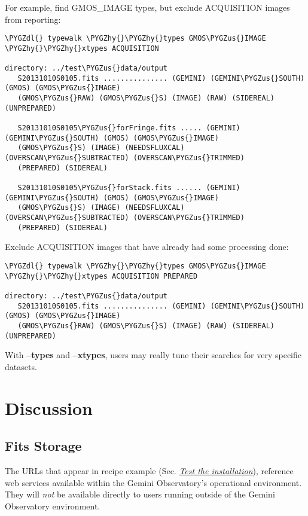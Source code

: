 \documentclass[letterpaper,10pt,english]{sphinxmanual}
\def\PYGZus{\char`\_}
\def\PYGZdl{\char`\$}
\def\PYGZhy{\char`\-}
\begin{document}
For example, find GMOS\_IMAGE types, but exclude ACQUISITION images from reporting:

\begin{Verbatim}[commandchars=\\\{\}]
\PYGZdl{} typewalk \PYGZhy{}\PYGZhy{}types GMOS\PYGZus{}IMAGE \PYGZhy{}\PYGZhy{}xtypes ACQUISITION

directory: ../test\PYGZus{}data/output
   S20131010S0105.fits ............... (GEMINI) (GEMINI\PYGZus{}SOUTH) (GMOS) (GMOS\PYGZus{}IMAGE)
   (GMOS\PYGZus{}RAW) (GMOS\PYGZus{}S) (IMAGE) (RAW) (SIDEREAL) (UNPREPARED)

   S20131010S0105\PYGZus{}forFringe.fits ..... (GEMINI) (GEMINI\PYGZus{}SOUTH) (GMOS) (GMOS\PYGZus{}IMAGE)
   (GMOS\PYGZus{}S) (IMAGE) (NEEDSFLUXCAL) (OVERSCAN\PYGZus{}SUBTRACTED) (OVERSCAN\PYGZus{}TRIMMED)
   (PREPARED) (SIDEREAL)

   S20131010S0105\PYGZus{}forStack.fits ...... (GEMINI) (GEMINI\PYGZus{}SOUTH) (GMOS) (GMOS\PYGZus{}IMAGE)
   (GMOS\PYGZus{}S) (IMAGE) (NEEDSFLUXCAL) (OVERSCAN\PYGZus{}SUBTRACTED) (OVERSCAN\PYGZus{}TRIMMED)
   (PREPARED) (SIDEREAL)
\end{Verbatim}

Exclude ACQUISITION images that have already had some processing done:

\begin{Verbatim}[commandchars=\\\{\}]
\PYGZdl{} typewalk \PYGZhy{}\PYGZhy{}types GMOS\PYGZus{}IMAGE \PYGZhy{}\PYGZhy{}xtypes ACQUISITION PREPARED

directory: ../test\PYGZus{}data/output
   S20131010S0105.fits ............... (GEMINI) (GEMINI\PYGZus{}SOUTH) (GMOS) (GMOS\PYGZus{}IMAGE)
   (GMOS\PYGZus{}RAW) (GMOS\PYGZus{}S) (IMAGE) (RAW) (SIDEREAL) (UNPREPARED)
\end{Verbatim}

With \textbf{--types} and \textbf{--xtypes}, users may really tune their searches for very
specific datasets.


\chapter{Discussion}
\label{discuss:discussion}\label{discuss::doc}

\section{Fits Storage}
\label{discuss:fits-storage}\label{discuss:fitsstore}
The URLs that appear in  recipe example (Sec. {\hyperref[userenv:test]{\emph{Test the installation}}}), reference web services
available within the Gemini Observatory's operational environment. They will
\emph{not} be available directly to users running  outside of the Gemini
Observatory environment.
\end{document}
